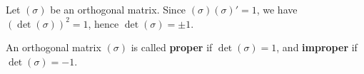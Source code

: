 Let $(\sigma)$ be an orthogonal matrix. Since $(\sigma)(\sigma)' = 1$, we have $(\det(\sigma))^2 = 1$, hence $\det(\sigma) = \pm 1$.

An orthogonal matrix $(\sigma)$ is called \textbf{proper} if $\det(\sigma) = 1$, and \textbf{improper} if $\det(\sigma) = -1$.
